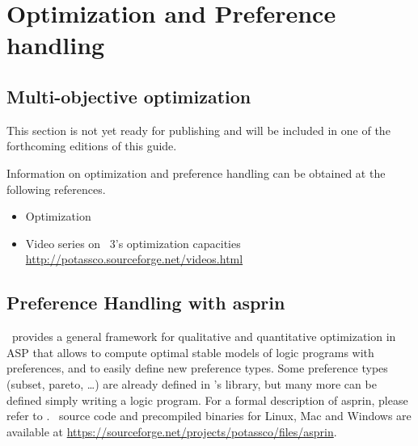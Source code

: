 
\section{Optimization and Preference handling}
\label{sec:prefopt}

\subsection{Multi-objective optimization}
\label{sec:oprimization}

This section is not yet ready for publishing
and will be included in one of the forthcoming editions of this guide.

Information on optimization and preference handling can be obtained at the following references.

\begin{itemize}
\item Optimization \cite{gekakasc11b,gekakasc11c,gekasc11b,ankamasc12a}
\item Video series on \clasp~3's optimization capacities \url{http://potassco.sourceforge.net/videos.html}
\end{itemize}

\subsection{Preference Handling with asprin}

\asprin\ provides a general framework for qualitative and quantitative optimization in ASP
that allows to compute optimal stable models of logic programs with preferences, and     
to easily define new preference types.
Some preference types (subset, pareto, \dots) are already defined in \asprin's library, 
but many more can be defined  simply writing a logic program.  
For a formal description of asprin, please refer to \cite{brderosc15a}. 
\asprin\ source code and precompiled binaries for Linux, Mac and Windows are available  
at \url{https://sourceforge.net/projects/potassco/files/asprin}.

% 
% 
% 

